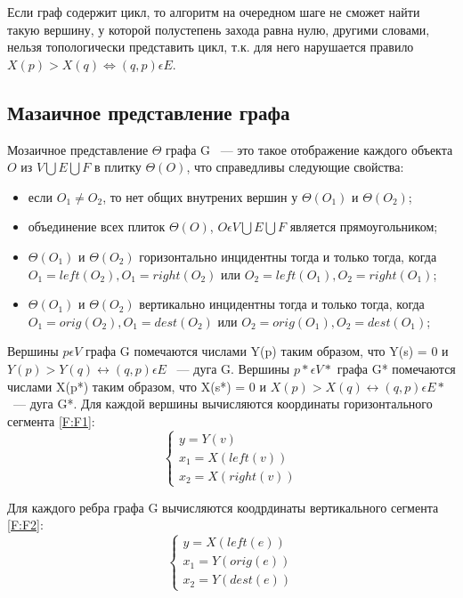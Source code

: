 
Если граф содержит цикл, то алгоритм на очередном шаге не сможет найти такую вершину, у которой полустепень захода равна нулю, другими словами, нельзя топологически представить цикл, т.к. для него нарушается правило $ X(p) > X(q) \Leftrightarrow (q, p) \epsilon E $.

\subsection{Мазаичное представление графа}

Мозаичное представление $ \Theta $ графа G ~--- это такое отображение каждого объекта $ O $ из $ V \bigcup E \bigcup F $ в плитку $ \Theta(O) $, что справедливы следующие свойства:
\begin{itemize}
\item если $ O_{1} \neq O_{2} $, то нет общих внутрених вершин у $ \Theta(O_{1}) $ и $ \Theta(O_{2}) $;
\item объединение всех плиток $ \Theta(O) $, $ O \epsilon V \bigcup E \bigcup F $ является прямоугольником;
\item $ \Theta(O_{1}) $ и $ \Theta(O_{2}) $ горизонтально инцидентны тогда и только тогда, когда $ O_{1} = left(O_{2}) , O_{1} = right(O_{2}) $ или $ O_{2} = left(O_{1}) , O_{2} = right(O_{1}) $;
\item $ \Theta(O_{1}) $ и $ \Theta(O_{2}) $ вертикально инцидентны тогда и только тогда, когда $ O_{1} = orig(O_{2}) , O_{1} = dest(O_{2}) $ или $ O_{2} = orig(O_{1}) , O_{2} = dest(O_{1}) $;
\end{itemize}

Вершины $ p \epsilon V $ графа G помечаются числами Y(p) таким образом, что Y(s) = 0 и $ Y(p) > Y(q) \leftrightarrow (q, p) \epsilon E $ ~--- дуга G.
Вершины $ p* \epsilon V* $ графа G* помечаются числами X(p*) таким образом, что X(s*) = 0 и $ X(p) > X(q) \leftrightarrow (q, p) \epsilon E* $ ~--- дуга G*.
Для каждой вершины вычисляются координаты горизонтального сегмента \ref{F:F1}:
\begin{equation}
	\begin{cases}
	y = Y(v) \\
	x_{1} = X(left(v)) \\
	x_{2} = X(right(v))
	\end{cases}
\label{F:F1}
\end{equation}

Для каждого ребра графа G вычисляются коодрдинаты вертикального сегмента \ref{F:F2}:
\begin{equation}
	\begin{cases}
	y = X(left(e)) \\
	x_{1} = Y(orig(e)) \\
	x_{2} = Y(dest(e))
	\end{cases}
\label{F:F2}
\end{equation}

